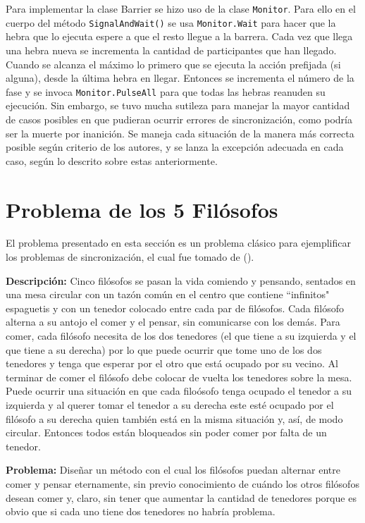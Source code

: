 \documentclass[12pt]{amsart}
\theoremstyle{definition}
\numberwithin{equation}{section}
\newcommand{\csl}[1]{\texttt{#1}}
\begin{document}
Para implementar la clase Barrier se hizo uso de la clase \csl{Monitor}. Para ello en el cuerpo del m\'etodo \csl{SignalAndWait()} se usa \csl{Monitor.Wait} para hacer que la hebra que lo ejecuta espere a que el resto llegue a la barrera. Cada vez que llega una hebra nueva se incrementa la cantidad de participantes que han llegado. Cuando se alcanza el m\'aximo lo primero que se ejecuta la acci\'on prefijada (si alguna), desde la \'ultima hebra en llegar. Entonces se incrementa el n\'umero de la fase y se invoca \csl{Monitor.PulseAll} para que todas las hebras reanuden su ejecuci\'on. Sin embargo, se tuvo mucha sutileza para manejar la mayor cantidad de casos posibles en que pudieran ocurrir errores de sincronizaci\'on, como podr\'ia ser la muerte por inanici\'on. Se maneja cada situaci\'on de la manera m\'as correcta posible seg\'un criterio de los autores, y se lanza la excepci\'on adecuada en cada caso, seg\'un lo descrito sobre estas anteriormente.

\section{Problema de los 5 Fil\'osofos}

El problema presentado en esta secci\'on es un problema cl\'asico para ejemplificar los problemas de sincronizaci\'on,  el cual fue tomado de (\cite[Ep\'igrafe 17.7.2.1]{katrip}).

\textbf{Descripci\'on:} Cinco fil\'osofos se pasan la vida comiendo y pensando, sentados en una mesa circular con un taz\'on com\'un en el centro que contiene ``infinitos" espaguetis y con un tenedor colocado entre cada par de fil\'osofos. Cada fil\'osofo alterna a su antojo el comer y el pensar, sin comunicarse con los dem\'as. Para comer, cada fil\'osofo necesita de los dos tenedores (el que tiene a su izquierda y el que tiene a su derecha) por lo que puede ocurrir que tome uno de los dos tenedores y tenga que esperar por el otro que est\'a ocupado por su vecino. Al terminar de comer el fil\'osofo debe colocar de vuelta los tenedores sobre la mesa. Puede ocurrir una situaci\'on en que cada filo\'osofo tenga ocupado el tenedor a su izquierda y al querer tomar el tenedor a su derecha este est\'e ocupado por el fil\'osofo a su derecha quien tambi\'en est\'a en la misma situaci\'on y, as\'i, de modo circular. Entonces todos est\'an bloqueados sin poder comer por falta de un tenedor.

\textbf{Problema:} Dise\~nar un m\'etodo con el cual los fil\'osofos puedan alternar entre comer y pensar eternamente, sin previo conocimiento de cu\'ando los otros fil\'osofos desean comer y, claro, sin tener que aumentar la cantidad de tenedores porque es obvio que si cada uno tiene dos tenedores no habr\'ia problema.
\end{document}
